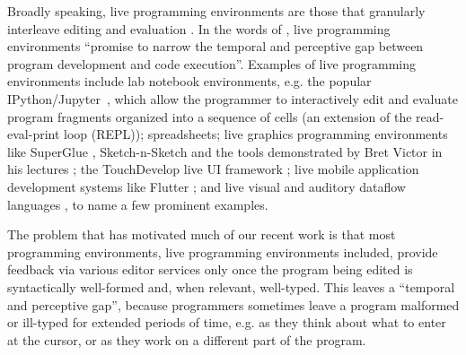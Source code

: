 
Broadly speaking, live programming environments are those that granularly interleave editing and evaluation \cite{DBLP:conf/icse/Tanimoto13,DBLP:journals/vlc/Tanimoto90,McDirmid:2007:LUL:1297027.1297073,burckhardt2013s}. 
In the words of \citet{burckhardt2013s}, live programming environments 
``promise to narrow the temporal and perceptive gap 
between program development and code execution''. Examples of live programming environments include {lab notebook environments},
e.g. the popular IPython/Jupyter~\cite{PER-GRA:2007}, which allow the
programmer to interactively edit and evaluate program fragments organized into a
sequence of cells (an extension of the read-eval-print loop (REPL)); spreadsheets; {live graphics programming environments} like SuperGlue \cite{McDirmid:2007:LUL:1297027.1297073}, Sketch-n-Sketch \cite{DBLP:conf/pldi/ChughHSA16} and the tools demonstrated by Bret Victor in his lectures \cite{victor2012inventing}; the TouchDevelop live UI framework \cite{burckhardt2013s}; live mobile application development systems like Flutter \cite{flutter}; and live visual and auditory dataflow languages \cite{DBLP:conf/vl/BurnettAW98}, to name a few prominent examples.


The problem that has motivated much of our recent work is that most  
programming environments, live programming environments included,  provide feedback via various editor services only once the program being edited is syntactically well-formed and, when relevant, well-typed. This leaves a ``temporal and perceptive gap'', because programmers sometimes leave a program malformed or ill-typed for extended periods of time, e.g. as they think about what to enter at the cursor, or as they work on a different part of the program.

